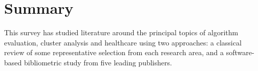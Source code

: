 \section{Summary}\label{sec:summary}

This survey has studied literature around the principal topics of algorithm
evaluation, cluster analysis and healthcare using two approaches: a classical
review of some representative selection from each research area, and a
software-based bibliometric study from five leading publishers.
